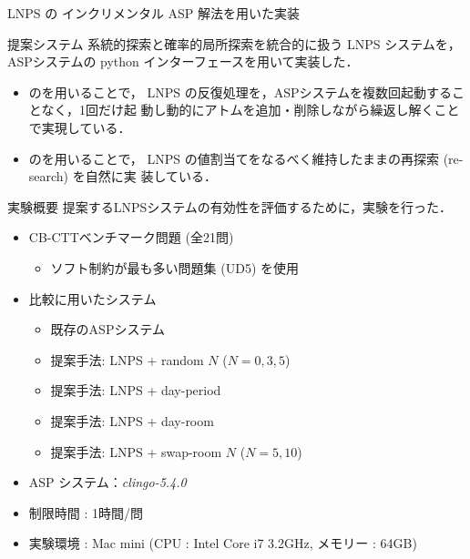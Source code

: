 \documentclass[11pt,dvipdfmx]{beamer}
\begin{document}
\begin{frame}{LNPS の インクリメンタル ASP 解法を用いた実装}

  \begin{block}{提案システム}\centering
    系統的探索と確率的局所探索を統合的に扱う LNPS システムを，
    ASPシステム{\clingo}の python インターフェースを用いて実装した．
  \end{block}

  \begin{itemize}
  \item {\clingo}のを用いることで，
    LNPS の反復処理を，ASPシステムを複数回起動することなく，1回だけ起
    動し動的にアトムを追加・削除しながら繰返し解くことで実現している．
  \item {\clingo}のを用いることで，
    LNPS の値割当てをなるべく維持したままの再探索 (re-search) を自然に実
    装している．
  \end{itemize}

\end{frame}
\begin{frame}{実験概要}
  提案するLNPSシステムの有効性を評価するために，実験を行った．
  \bigskip
  \begin{itemize}
  \item CB-CTTベンチマーク問題 (全21問)
    \begin{itemize}
    \item ソフト制約が最も多い問題集 (UD5) を使用
    \end{itemize}
  \item 比較に用いたシステム
    \begin{itemize}
    \item 既存のASPシステム{\clingo}
    \item 提案手法: LNPS + random $N$ ($N=0, 3, 5$)
    \item 提案手法: LNPS + day-period
    \item 提案手法: LNPS + day-room
    \item 提案手法: LNPS + swap-room $N$ ($N=5, 10$)
    \end{itemize}
  \item ASP システム：\textit{clingo-5.4.0}
  \item 制限時間 : 1時間/問
  \item 実験環境 : Mac mini (CPU : Intel Core i7 3.2GHz, メモリー : 64GB) 
  \end{itemize}
\end{frame}
\end{document}
